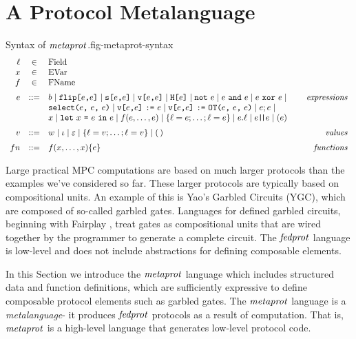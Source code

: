 \section{A Protocol Metalanguage}
\label{section-metalang}

\begin{fpfig}[t]{Syntax of $\mathit{metaprot}$.}{fig-metaprot-syntax}
$$
\begin{array}{rcl@{\hspace{8mm}}r}
\flab &\in& \mathrm{Field}\\
x &\in& \mathrm{EVar}\\
f &\in& \mathrm{FName}\\[2mm]
e &::=& b \mid \flip{e}{e} \mid \secret{e}{e} \mid \view{e}{e} \mid \oracle{e} \mid \enot\ e \mid e\ \eand\ e \mid e\ \exor\ e \mid & \textit{expressions}\\[0mm]
& & \select{e}{e}{e} \mid 
\send{\view{e}{e}}{e} \mid \send{\view{e}{e}}{\OT{e}{e}{e}} \mid e;e \mid \\[0mm]
& & x \mid \elet{x}{e}{e} \mid f(e,\ldots,e) \mid \{ \flab = e; \ldots; \flab = e \}
\mid e.\flab \mid e\concat e \mid (e) \\[2mm]
v &::=& w \mid \cid \mid \be \mid \{ \flab = v;\ldots;\flab = v \} 
\mid (\,) & \textit{values}\\[2mm]
{fn} &::=& f(x,\ldots,x) \{ e \} & \textit{functions}
\end{array}
$$
\end{fpfig}

Large practical MPC computations are based on much larger protocols
than the examples we've considered so far. These larger protocols are
typically based on compositional units. An example of this is Yao's
Garbled Circuits (YGC), which are composed of so-called garbled gates.
Languages for defined garbled circuits, beginning with Fairplay \cite{XXX},
treat gates as compositional units that are wired together by the programmer
to generate a complete circuit. The $\mathit{fedprot}$ language is low-level
and does not include abstractions for defining composable elements. 

In this Section we introduce the $\mathit{metaprot}$ language which includes
structured data and function definitions, which are sufficiently
expressive to define composable protocol elements such as garbled
gates. The $\mathit{metaprot}$ language is a \emph{metalanguage}- it produces
$\mathit{fedprot}$ protocols as a result of computation. That is, $\mathit{metaprot}$ is
a high-level language that generates low-level protocol code. 

